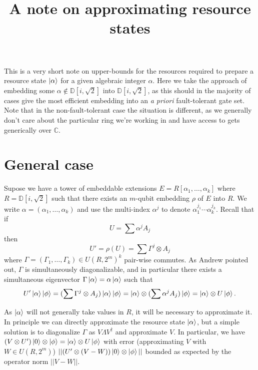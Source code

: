 \documentclass{article}
\title{A note on approximating resource states}
\theoremstyle{definition}
\theoremstyle{theorem}
\theoremstyle{remark}
\begin{document}
\maketitle

This is a very short note on upper-bounds for the resources required to prepare a resource state $\ket{\alpha}$ for a given algebraic integer $\alpha$. Here we take the approach of embedding some $\alpha\notin\mathbb{D}[i, \sqrt{2}]$ into $\mathbb{D}[i, \sqrt{2}]$, as this should in the majority of cases give the most efficient embedding into an \emph{a priori} fault-tolerant gate set. Note that in the non-fault-tolerant case the situation is different, as we generally don't care about the particular ring we're working in and have access to gets generically over $\mathbb{C}$.

\section{General case}

Supose we have a tower of embeddable extensions $E=R[\alpha_1,\dots,\alpha_k]$ where $R=\mathbb{D}[i, \sqrt{2}]$ such that there exists an $m$-qubit embedding $\rho$ of $E$ into $R$. We write $\alpha=(\alpha_1,\dots,\alpha_k)$ and use the multi-index $\alpha^j$ to denote $\alpha_1^{j_1}\cdots \alpha_k^{j_k}$. Recall that if
\[
	U = \sum \alpha^j A_{j}
\]
then 
\[
	U'=\rho(U)=\sum\Gamma^j\otimes A_j
\]
where $\Gamma=(\Gamma_1,\dots,\Gamma_k)\in U(R,2^m)^k$ pair-wise commutes. As Andrew pointed out, $\Gamma$ is simultaneously diagonalizable, and in particular there exists a simultaneous eigenvector $\Gamma\ket{\alpha} = \alpha\ket{\alpha}$ such that
\[
	U'\ket{\alpha}\ket{\phi} 
		= (\sum\Gamma^j\otimes A_j)\ket{\alpha}\ket{\phi} 
		= \ket{\alpha}\otimes (\sum\alpha^jA_j)\ket{\phi} 
		= \ket{\alpha}\otimes U\ket{\phi}.
\]

As $\ket{\alpha}$ will not generally take values in $R$, it will be necessary to approximate it. In principle we can directly approximate the resource state $\ket{\alpha}$, but a simple solution is to diagonalize $\Gamma$ as $V\Lambda V^\dagger$ and approximate $V$. In particular, we have $(V\otimes U')\ket{0}\otimes\ket{\phi} = \ket{\alpha}\otimes U\ket{\phi}$ with error (approximating $V$ with $W\in U(R,2^m)$) $||(U'\otimes(V - W))\ket{0}\otimes\ket{\phi}||$ bounded as expected by the operator norm $||V - W||$.
\end{document}
